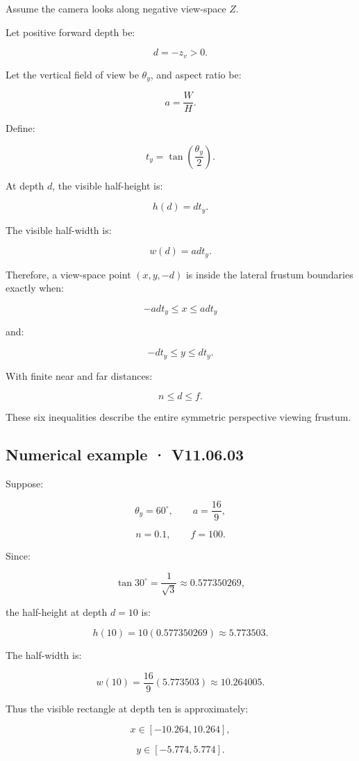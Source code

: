 Assume the camera looks along negative view-space \(Z\).

Let positive forward depth be:

\[
 d=-z_v>0.
\]

Let the vertical field of view be \(\theta_y\), and aspect ratio be:

\[
 a=\frac WH.
\]

Define:

\[
 t_y=\tan\left(\frac{\theta_y}{2}\right).
\]

At depth \(d\), the visible half-height is:

\[
 \boxed{h(d)=dt_y}.
\]

The visible half-width is:

\[
 \boxed{w(d)=ad t_y}.
\]

Therefore, a view-space point \((x,y,-d)\) is inside the lateral frustum boundaries exactly when:

\[
 \boxed{-ad t_y\le x\le ad t_y}
\]

and:

\[
 \boxed{-dt_y\le y\le dt_y}.
\]

With finite near and far distances:

\[
 \boxed{n\le d\le f}.
\]

These six inequalities describe the entire symmetric perspective viewing frustum.

\subsection{Numerical example · V11.06.03}\label{02-foundations-ii-ch034-numerical-example-v11.06.03}

Suppose:

\[
 \theta_y=60^\circ,\qquad a=\frac{16}{9},
\]

\[
 n=0.1,\qquad f=100.
\]

Since:

\[
 \tan30^\circ=\frac1{\sqrt3}\approx0.577350269,
\]

the half-height at depth \(d=10\) is:

\[
 h(10)=10(0.577350269)\approx5.773503.
\]

The half-width is:

\[
 w(10)=\frac{16}{9}(5.773503)\approx10.264005.
\]

Thus the visible rectangle at depth ten is approximately:

\[
 x\in[-10.264,10.264],
\]

\[
 y\in[-5.774,5.774].
\]

